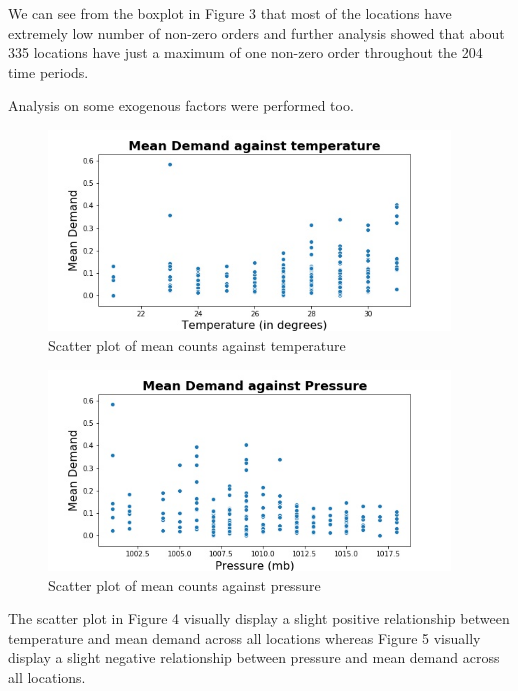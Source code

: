 \documentclass[12pt, letterpaper] {article}
\begin{document}
\noindent We can see from the boxplot in Figure 3 that most of the locations have extremely low number of non-zero orders and further analysis showed that about 335 locations have just a maximum of one non-zero order throughout the 204 time periods. 

\noindent Analysis on some exogenous factors were performed too. 
\begin{figure}[H]
    \centering
    \includegraphics[width=0.95\textwidth, height=0.32\textheight]{Images/temp_mean_demand.jpg}
    \caption{Scatter plot of mean counts against temperature}
    \label{fig:Scatter plot of mean counts against temperature}
\end{figure}

\begin{figure}[H]
    \centering
    \includegraphics[width=0.95\textwidth, height=0.32\textheight]{Images/pressure_mean_demand.jpg}
    \caption{Scatter plot of mean counts against pressure}
    \label{fig:Scatter plot of mean counts against pressure}
\end{figure}

\noindent The scatter plot in Figure 4 visually display a slight positive relationship between temperature and mean demand across all locations whereas Figure 5 visually display a slight negative relationship between pressure and mean demand across all locations. 
\end{document}
